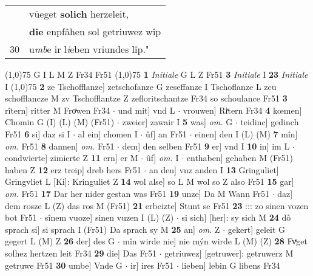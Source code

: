 \documentclass[8pt,a4paper,notitlepage]{article}
\begin{document}
\begin{table}[ht]
\begin{minipage}[t]{0.5\linewidth}
\begin{tabular}{rl}
 & vüeget \textbf{solich} herzeleit,\\ 
 & \textbf{die} enpfâhen sol getriuwez wîp\\ 
30 & u\textit{mb}e ir l\textit{i}eben vriundes lîp."\\ 
\end{tabular}
\scriptsize
\line(1,0){75} \newline
G I L M Z Fr34 Fr51 \newline
\line(1,0){75} \newline
\textbf{1} \textit{Initiale} G L Z Fr51  \textbf{3} \textit{Initiale} I  \textbf{23} \textit{Initiale} I  \newline
\line(1,0){75} \newline
\textbf{2} ze Tschofflanze] zetschofanze G zeseffanze I Tschoflanze L zcu schofflancze M zv Tschofflantze Z zefloritschantze Fr34 so schoulance Fr51 \textbf{3} rîtern] ritter M Froͯwen Fr34  $\cdot$ und mit] vnd L  $\cdot$ vrouwen] Riͯtern Fr34 \textbf{4} kœmen] Chomin G (I) (L) (M) (Fr51)  $\cdot$ zweier] zawair I \textbf{5} was] \textit{om.} G  $\cdot$ teidinc] gedinch Fr51 \textbf{6} si] daz si I  $\cdot$ al ein] chomen I  $\cdot$ ûf] an Fr51  $\cdot$ einen] den I (L) (M) \textbf{7} mîn] \textit{om.} Fr51 \textbf{8} dannen] \textit{om.} Fr51  $\cdot$ dem] den selben Fr51 \textbf{9} er] vnd I \textbf{10} in] im L  $\cdot$ condwierte] zimierte Z \textbf{11} ern] er M  $\cdot$ ûf] \textit{om.} I  $\cdot$ enthaben] gehaben M (Fr51) haben Z \textbf{12} erz treip] dreb hers Fr51  $\cdot$ an den] vnz anden I \textbf{13} Gringuliet] Gringvliet L [Ki]: Kringuliet Z \textbf{14} wol alse] so L M wol so Z also Fr51 \textbf{15} gar] \textit{om.} Fr51 \textbf{17} Dar her nider gestan was Fr51 \textbf{19} unze] Da M Wann Fr51  $\cdot$ daz] dem rosze L (Z) das ros M (Fr51) \textbf{21} erbeizte] Stunt se Fr51 \textbf{23} ::: zo sinen vozen bot Fr51  $\cdot$ sînem vuoze] sinen vuzen I (L) (Z)  $\cdot$ si sich] [her]: sy sich M \textbf{24} dô sprach si] si sprach I (Fr51) Da sprach sy M \textbf{25} an] \textit{om.} Z  $\cdot$ gekert] geleit G gegert L (M) Z \textbf{26} der] des G  $\cdot$ mîn wirde nie] nie mýn wirde L (M) (Z) \textbf{28} Fvͤget solhez hertzen leit Fr34 \textbf{29} die] Das Fr51  $\cdot$ getriuwez] [getruwer]: getruwerz M getruwe Fr51 \textbf{30} umbe] Vnde G  $\cdot$ ir] ires Fr51  $\cdot$ lieben] lebin G libens Fr34 \newline
\end{minipage}
\hspace{0.5cm}
\begin{minipage}[t]{0.5\linewidth}

\end{minipage}
\end{table}
\end{document}
